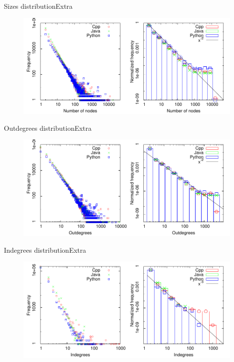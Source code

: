 \documentclass[11pt,svgnames]{beamer}
\begin{document}
\begin{frame}[noframenumbering]{Sizes distribution}{Extra}
\begin{figure}[p]%
\includegraphics[width=12cm,draft=false]{immagini/fDNnodes.pdf}
\end{figure}
\end{frame}
\begin{frame}[noframenumbering]{Outdegrees distribution}{Extra}
\begin{figure}[p]%
\includegraphics[width=12cm,draft=false]{immagini/fDoutdeg.pdf}
\end{figure}
\end{frame}
\begin{frame}[noframenumbering]{Indegrees distribution}{Extra}
\begin{figure}[p]%
\includegraphics[width=12cm,draft=false]{immagini/fDindeg.pdf}
\end{figure}
\end{frame}
\end{document}
